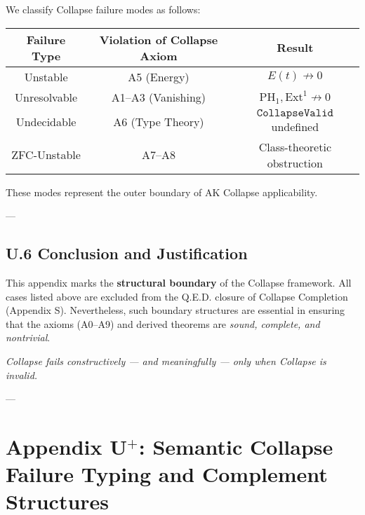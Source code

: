 \documentclass[11pt]{article}
\begin{document}
We classify Collapse failure modes as follows:

\begin{center}
\begin{tabular}{|c|c|c|}
\hline
\textbf{Failure Type} & \textbf{Violation of Collapse Axiom} & \textbf{Result} \\
\hline
Unstable & A5 (Energy) & $E(t) \not\to 0$ \\
Unresolvable & A1–A3 (Vanishing) & $\mathrm{PH}_1, \mathrm{Ext}^1 \not\to 0$ \\
Undecidable & A6 (Type Theory) & $\texttt{CollapseValid}$ undefined \\
ZFC-Unstable & A7–A8 & Class-theoretic obstruction \\
\hline
\end{tabular}
\end{center}

These modes represent the outer boundary of AK Collapse applicability.

---

\subsection*{U.6 Conclusion and Justification}

This appendix marks the \textbf{structural boundary} of the Collapse framework.  
All cases listed above are excluded from the Q.E.D. closure of Collapse Completion (Appendix S).  
Nevertheless, such boundary structures are essential in ensuring that the axioms (A0–A9) and derived theorems are \textit{sound, complete, and nontrivial}.

\begin{center}
\textit{Collapse fails constructively — and meaningfully — only when Collapse is invalid.}
\end{center}

---


\section*{Appendix U$^{+}$: Semantic Collapse Failure Typing and Complement Structures}
\end{document}
